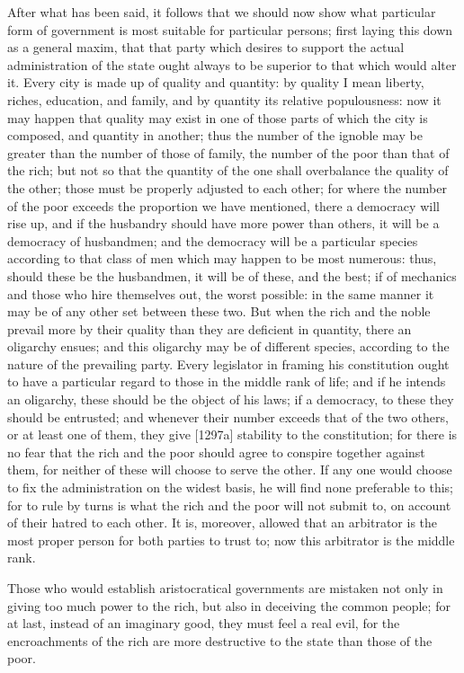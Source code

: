 After what has been said, it follows that we should now show what
particular form of government is most suitable for particular persons;
first laying this down as a general maxim, that that party which desires
to support the actual administration of the state ought always to be
superior to that which would alter it. Every city is made up of quality
and quantity: by quality I mean liberty, riches, education, and family,
and by quantity its relative populousness: now it may happen that quality
may exist in one of those parts of which the city is composed, and
quantity in another; thus the number of the ignoble may be greater than
the number of those of family, the number of the poor than that of the
rich; but not so that the quantity of the one shall overbalance the
quality of the other; those must be properly adjusted to each other; for
where the number of the poor exceeds the proportion we have mentioned,
there a democracy will rise up, and if the husbandry should have more
power than others, it will be a democracy of husbandmen; and the democracy
will be a particular species according to that class of men which may
happen to be most numerous: thus, should these be the husbandmen, it will
be of these, and the best; if of mechanics and those who hire themselves
out, the worst possible: in the same manner it may be of any other set
between these two. But when the rich and the noble prevail more by their
quality than they are deficient in quantity, there an oligarchy ensues;
and this oligarchy may be of different species, according to the nature of
the prevailing party. Every legislator in framing his constitution ought
to have a particular regard to those in the middle rank of life; and if he
intends an oligarchy, these should be the object of his laws; if a
democracy, to these they should be entrusted; and whenever their number
exceeds that of the two others, or at least one of them, they give [1297a]
stability to the constitution; for there is no fear that the rich and the
poor should agree to conspire together against them, for neither of these
will choose to serve the other. If any one would choose to fix the
administration on the widest basis, he will find none preferable to this;
for to rule by turns is what the rich and the poor will not submit to, on
account of their hatred to each other. It is, moreover, allowed that an
arbitrator is the most proper person for both parties to trust to; now
this arbitrator is the middle rank.

Those who would establish aristocratical governments are mistaken not only
in giving too much power to the rich, but also in deceiving the common
people; for at last, instead of an imaginary good, they must feel a real
evil, for the encroachments of the rich are more destructive to the state
than those of the poor.

